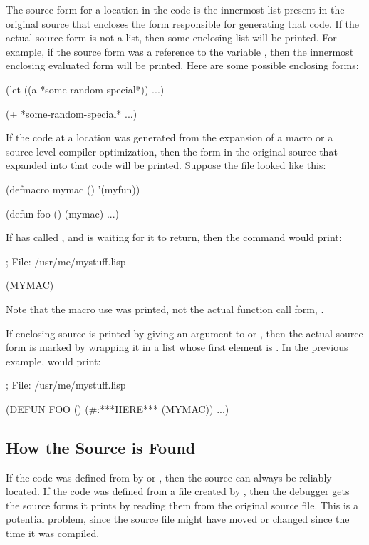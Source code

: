 The source form for a location in the code is the innermost list present
in the original source that encloses the form responsible for generating
that code.  If the actual source form is not a list, then some enclosing
list will be printed.  For example, if the source form was a reference
to the variable , then the innermost
enclosing evaluated form will be printed.  Here are some possible
enclosing forms:
\begin{example}
(let ((a *some-random-special*))
  ...)

(+ *some-random-special* ...)
\end{example}

If the code at a location was generated from the expansion of a macro or a
source-level compiler optimization, then the form in the original source that
expanded into that code will be printed.  Suppose the file
 looked like this:
\begin{example}
(defmacro mymac ()
  '(myfun))

(defun foo ()
  (mymac)
  ...)
\end{example}
If  has called , and is waiting for it to return, then the
 command would print:
\begin{example}
; File: /usr/me/mystuff.lisp

(MYMAC)
\end{example}
Note that the macro use was printed, not the actual function call form,
.

If enclosing source is printed by giving an argument to  or
, then the actual source form is marked by wrapping it in a list
whose first element is .  In the previous example, 
 would print:
\begin{example}
; File: /usr/me/mystuff.lisp

(DEFUN FOO ()
  (#:***HERE***
   (MYMAC))
  ...)
\end{example}


\subsection{How the Source is Found}

If the code was defined from \llisp{} by  or
, then the source can always be reliably located.  If the
code was defined from a  file created by
, then the debugger gets the source forms it
prints by reading them from the original source file.  This is a
potential problem, since the source file might have moved or changed
since the time it was compiled.

